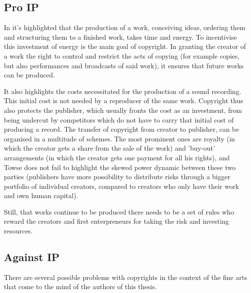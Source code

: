 \documentclass[a4paper]{report}
\begin{document}
\subsection{Pro IP}
In \cite{Towse1999} it's highlighted that the production of a work, conceiving ideas, ordering them and structuring them to a finished work, takes time and energy. To incentivise this investment of energy is the main goal of copyright. In granting the creator of a work the right to control and restrict the acts of copying (for example copies, but also performances and broadcasts of said work), it ensures that future works can be produced.

It also highlights the costs necessitated for the production of a sound recording. This initial cost is not needed by a reproducer of the same work. Copyright thus also protects the publisher, which usually fronts the cost as an investment, from being undercut by competitors which do not have to carry that initial cost of producing a record. The transfer of copyright from creator to publisher, can be organised in a multitude of schemes. The most prominent ones are royalty (in which the creator gets a share from the sale of the work) and 'buy-out' arrangements (in which the creator gets one payment for all his rights), and Towse does not fail to highlight the skewed power dynamic between these two parties (publishers have more possibility to distribute risks through a bigger portfolio of individual creators, compared to creators who only have their work and own human capital).

Still, that works continue to be produced there needs to be a set of rules who reward the creators and first enterpreneurs for taking the risk and investing resources.

\subsection{Against IP}
There are several possible problems with copyrights in the context of the fine arts that come to the mind of the authors of this thesis. 
\end{document}
